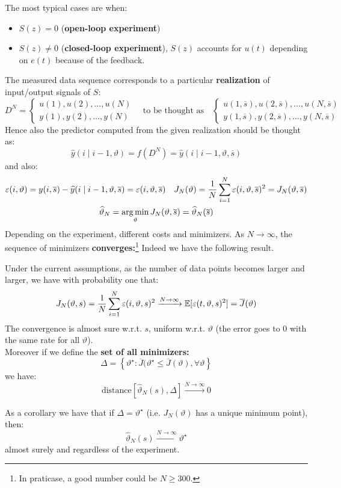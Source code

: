 The most typical cases are when:
\begin{itemize}
	\item $S(z)=0$ (\textbf{open-loop experiment})
	\item $S(z)\neq 0$ (\textbf{closed-loop experiment}), $S(z)$ accounts for $u(t)$ depending on $e(t)$ because of the feedback.
\end{itemize}
The measured data sequence corresponds to a particular \textbf{realization} of input/output signals of $S$:
\[
	D^{N}=
	\begin{cases}
	 	u(1),u(2),\ldots,u(N)\\
	 	y(1),y(2),\ldots,y(N)
	\end{cases}
	\quad
	\text{to be thought as}
	\quad
	\begin{cases}
	 	u(1,\overline{s}),u(2,\overline{s}),\ldots,u(N,\overline{s})\\
	 	y(1,\overline{s}),y(2,\overline{s}),\ldots,y(N,\overline{s})
	\end{cases}
\]
Hence also the predictor computed from the given realization should be thought as:
\[
	\hat{y}(i\mid i-1,\vartheta) = f(D^{N}) = \hat{y}(i\mid i-1,\vartheta,\overline{s})
\]
and also:
\begin{gather*}
	\varepsilon(i,\vartheta) = y(i,\overline{s}) - \widehat{y}(i\mid i-1,\vartheta,\overline{s}) = \varepsilon(i,\vartheta,\overline{s})
	\quad
	J_{N}(\vartheta) = \frac{1}{N}\sum_{i=1}^{N} \varepsilon(i,\vartheta,\overline{s})^2 = J_{N}(\vartheta,\overline{s})\\
	\widehat{\vartheta}_{N} = \operatorname*{arg\,min}_{\vartheta} J_{N}(\vartheta,\overline{s}) = \widehat{\vartheta}_{N}(\overline{s})
\end{gather*}
Depending on the experiment, different costs and minimizers. As $N\to \infty$, the sequence of minimizers \textbf{converges:}\footnote{In praticase, a good number could be $N\geq 300$.}
Indeed we have the following result.
\begin{theorem}
	Under the current assumptions, as the number of data points becomes larger and larger, we have with probability one that:
	\[
		J_{N}(\vartheta,s) = \frac{1}{N}\sum_{i=1}^{N} \varepsilon(i,\vartheta,s)^2 \xrightarrow{N\to\infty} \mathbb{E}[\varepsilon(t,\vartheta,s)^2] = \overline{J}(\vartheta)
	\]
	The convergence is almost sure w.r.t. $s$, uniform w.r.t. $\vartheta$ (the error goes to $0$ with the same rate for all $\vartheta$).\\
	Moreover if we define the \textbf{set of all minimizers:}
	\[
		\Delta = \left\{ \vartheta ^{\star} : \overline{J}(\vartheta ^{\star}\le \overline{J}(\vartheta),\forall \vartheta  \right\}
	\]
	we have:
	\[
		\text{distance}[\hat{\vartheta}_{N}(s), \Delta]\xrightarrow{N\to\infty} 0
	\]
\end{theorem}
As a corollary we have that if $\Delta ={\vartheta ^{\star} }$ (i.e. $J_{N}(\vartheta)$ has a unique minimum point), then:
\[
	\hat{\vartheta}_{N}(s) \xrightarrow{N\to\infty} \vartheta ^{\star} 
\]
almost surely and regardless of the experiment.

